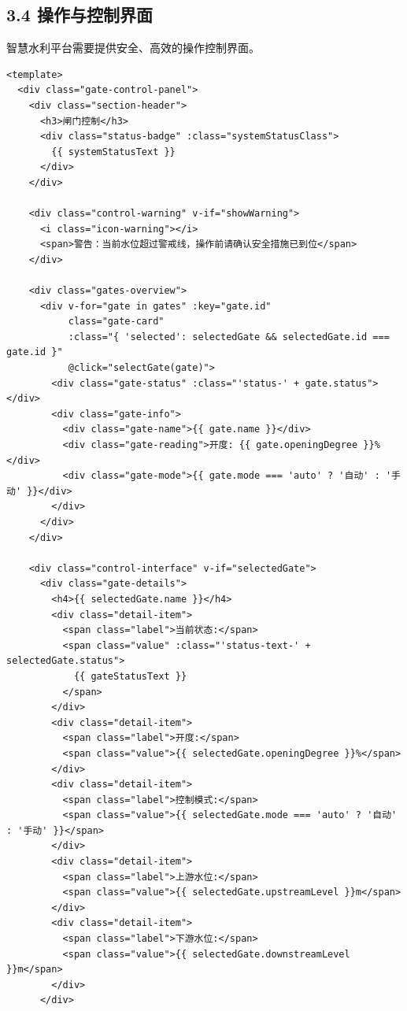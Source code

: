 \subsection{3.4
操作与控制界面}\label{ux64cdux4f5cux4e0eux63a7ux5236ux754cux9762}

智慧水利平台需要提供安全、高效的操作控制界面。

\begin{lstlisting}
<template>
  <div class="gate-control-panel">
    <div class="section-header">
      <h3>闸门控制</h3>
      <div class="status-badge" :class="systemStatusClass">
        {{ systemStatusText }}
      </div>
    </div>
    
    <div class="control-warning" v-if="showWarning">
      <i class="icon-warning"></i>
      <span>警告：当前水位超过警戒线，操作前请确认安全措施已到位</span>
    </div>
    
    <div class="gates-overview">
      <div v-for="gate in gates" :key="gate.id" 
           class="gate-card" 
           :class="{ 'selected': selectedGate && selectedGate.id === gate.id }"
           @click="selectGate(gate)">
        <div class="gate-status" :class="'status-' + gate.status"></div>
        <div class="gate-info">
          <div class="gate-name">{{ gate.name }}</div>
          <div class="gate-reading">开度: {{ gate.openingDegree }}%</div>
          <div class="gate-mode">{{ gate.mode === 'auto' ? '自动' : '手动' }}</div>
        </div>
      </div>
    </div>
    
    <div class="control-interface" v-if="selectedGate">
      <div class="gate-details">
        <h4>{{ selectedGate.name }}</h4>
        <div class="detail-item">
          <span class="label">当前状态:</span>
          <span class="value" :class="'status-text-' + selectedGate.status">
            {{ gateStatusText }}
          </span>
        </div>
        <div class="detail-item">
          <span class="label">开度:</span>
          <span class="value">{{ selectedGate.openingDegree }}%</span>
        </div>
        <div class="detail-item">
          <span class="label">控制模式:</span>
          <span class="value">{{ selectedGate.mode === 'auto' ? '自动' : '手动' }}</span>
        </div>
        <div class="detail-item">
          <span class="label">上游水位:</span>
          <span class="value">{{ selectedGate.upstreamLevel }}m</span>
        </div>
        <div class="detail-item">
          <span class="label">下游水位:</span>
          <span class="value">{{ selectedGate.downstreamLevel }}m</span>
        </div>
      </div>
      

\end{lstlisting}
